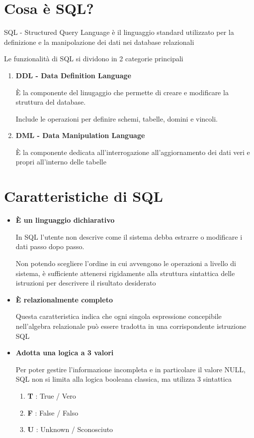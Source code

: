 \section{Cosa è SQL?}
SQL - Structured Query Language è il linguaggio standard utilizzato per la definizione e la manipolazione dei dati nei database relazionali

\vspace{\baselineskip}

Le funzionalità di SQL si dividono in 2 categorie principali
\begin{enumerate}
    \item \textbf{DDL - Data Definition Language}

    È la componente del linugaggio che permette di creare e modificare la struttura del database.

    Include le operazioni per definire schemi, tabelle, domini e vincoli.

    \item \textbf{DML - Data Manipulation Language}

    È la componente dedicata all'interrogazione all'aggiornamento dei dati veri e propri all'interno delle tabelle
\end{enumerate}

\section{Caratteristiche di SQL}
\begin{itemize}
    \item \textbf{È un linguaggio dichiarativo}

    In SQL l'utente non descrive come il sistema debba estrarre o modificare i dati passo dopo passo.

    Non potendo scegliere l'ordine in cui avvengono le operazioni a livello di sistema, è sufficiente attenersi rigidamente alla struttura sintattica delle istruzioni per descrivere il risultato 
    desiderato

    \item \textbf{È relazionalmente completo}

    Questa caratteristica indica che ogni singola espressione concepibile nell'algebra relazionale può essere tradotta in una corrispondente istruzione SQL

    \item \textbf{Adotta una logica a 3 valori}

    Per poter gestire l'informazione incompleta e in particolare il valore NULL, SQL non si limita alla logica booleana classica, ma utilizza 3 sintattica

        \begin{enumerate}
            \item \textbf{T} : True / Vero
            \item \textbf{F} : False / Falso
            \item \textbf{U} : Unknown / Sconosciuto
        \end{enumerate}
\end{itemize}

